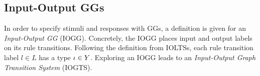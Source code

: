 \subsection{Input-Output GGs}
In order to specify stimuli and responses with GGs, a definition is given for an \textit{Input-Output GG} (IOGG). Concretely, the IOGG places input and output labels on its rule transitions. Following the definition from IOLTSs, each rule transition label $l \in L$ has a type $\iota \in Y$. Exploring an IOGG leads to an \textit{Input-Output Graph Transition System} (IOGTS).
